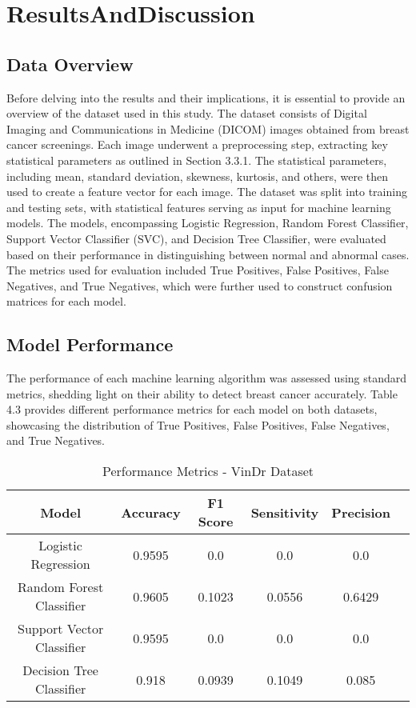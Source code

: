 \chapter{ResultsAndDiscussion}
\label{chap4}
\section{Data Overview}
Before delving into the results and their implications, it is essential to provide an overview of the dataset used in this study. The dataset consists of Digital Imaging and Communications in Medicine (DICOM) images obtained from breast cancer screenings. Each image underwent a preprocessing step, extracting key statistical parameters as outlined in Section 3.3.1. The statistical parameters, including mean, standard deviation, skewness, kurtosis, and others, were then used to create a feature vector for each image.
The dataset was split into training and testing sets, with statistical features serving as input for machine learning models. The models, encompassing Logistic Regression, Random Forest Classifier, Support Vector Classifier (SVC), and Decision Tree Classifier, were evaluated based on their performance in distinguishing between normal and abnormal cases. The metrics used for evaluation included True Positives, False Positives, False Negatives, and True Negatives, which were further used to construct confusion matrices for each model.

\section{Model Performance}
The performance of each machine learning algorithm was assessed using standard metrics, shedding light on their ability to detect breast cancer accurately. Table 4.3 provides different performance metrics for each model on both datasets, showcasing the distribution of True Positives, False Positives, False Negatives, and True Negatives.


\begin{table}[htbp]
  \centering
  \caption{Performance Metrics - VinDr Dataset}
  \begin{tabular}{|c|c|c|c|c|c|}
    \hline
    Model & Accuracy & F1 Score & Sensitivity & Precision \\
    \hline
    Logistic Regression & 0.9595 & 0.0 & 0.0 & 0.0 \\
    Random Forest Classifier & 0.9605 & 0.1023 & 0.0556 & 0.6429 \\
    Support Vector Classifier & 0.9595 & 0.0 & 0.0 & 0.0 \\
    Decision Tree Classifier & 0.918 & 0.0939 & 0.1049 & 0.085 \\
    \hline
  \end{tabular}
\end{table}

